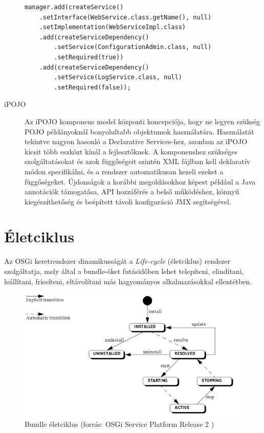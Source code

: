 \begin{description}
\begin{lstlisting}[label={lst:dependencymanager_example}, caption=Példa a DependencyManager használatára,breaklines=true]
manager.add(createService()
    .setInterface(WebService.class.getName(), null)
    .setImplementation(WebServiceImpl.class)
    .add(createServiceDependency()
        .setService(ConfigurationAdmin.class, null)
        .setRequired(true))
    .add(createServiceDependency()
        .setService(LogService.class, null)
        .setRequired(false));
\end{lstlisting}

    \item[iPOJO] Az iPOJO komponens model központi koncepciója, hogy ne legyen szükség POJO példányoknál bonyolultabb objektumok használatára. Használatát tekintve nagyon hasonló a Declarative Services-hez, azonban az iPOJO kicsit több eszközt kínál a fejlesztőknek. A komponenshez szükséges szolgáltatásokat és azok függőségeit szintén XML fájlban kell deklaratív módon specifikálni, és a rendszer automatikusan kezeli ezeket a függőségeket. Újdonságok a korábbi megoldásokhoz képest például a Java annotációk támogatása, API hozzáférés a belső működéshez, könnyű kiegészíthetőség és beépített távoli konfiguráció JMX segítségével.
 
\end{description}


\newpage

\section{Életciklus}
\label{sec:lifecycle}

Az OSGi keretrendszer dinamikusságát a \textit{Life-cycle} (életciklus) rendszer szolgáltatja, mely által a bundle-öket futásidőben lehet telepíteni, elindítani, leállítani, frissíteni, eltávolítani más hagyományos alkalmazásokkal ellentétben.

\begin{figure}[htb]
\centering
\includegraphics[scale=0.5]{img/bundle_lifecycle}
\caption{Bundle életciklus (forrás: OSGi Service Platform Release 2 \cite{osgi})}
\label{fig:bundle_lifecycle}
\end{figure}

